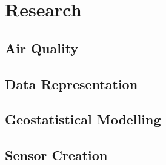 \section{Research}\label{research}
\subsection{Air Quality}\label{research_airquality}
\subsection{Data Representation}\label{research_datarepresentation}
\subsection{Geostatistical Modelling}\label{research_geostatisitcalmodelling}
\subsection{Sensor Creation}\label{research_sensorcreation}

